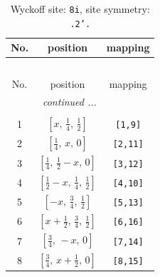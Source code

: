 \documentclass[fleqn,8pt]{jsarticle}
\begin{document}
\begin{longtable}{ccc}
\caption{Wyckoff site: {\tt 8i}, site symmetry: {\tt .2'.}}
 \\
 \hline \hline
No. & position & mapping \\ \hline \endfirsthead

\multicolumn{2}{l}{\tablename\ \thetable{}} \\
 \hline \hline
No. & position & mapping \\ \hline \endhead

 \hline \hline
\multicolumn{2}{r}{\footnotesize\it continued ...} \\ \endfoot

 \hline \hline
\multicolumn{2}{r}{} \\ \endlastfoot

1 & $\left[ x,\, \frac{1}{4},\, \frac{1}{2} \right]$ & {\tt [1,9]} \\ \hline
2 & $\left[ \frac{1}{4},\, x,\, 0 \right]$ & {\tt [2,11]} \\ \hline
3 & $\left[ \frac{1}{4},\, \frac{1}{2} - x,\, 0 \right]$ & {\tt [3,12]} \\ \hline
4 & $\left[ \frac{1}{2} - x,\, \frac{1}{4},\, \frac{1}{2} \right]$ & {\tt [4,10]} \\ \hline
5 & $\left[ - x,\, \frac{3}{4},\, \frac{1}{2} \right]$ & {\tt [5,13]} \\ \hline
6 & $\left[ x + \frac{1}{2},\, \frac{3}{4},\, \frac{1}{2} \right]$ & {\tt [6,16]} \\ \hline
7 & $\left[ \frac{3}{4},\, - x,\, 0 \right]$ & {\tt [7,14]} \\ \hline
8 & $\left[ \frac{3}{4},\, x + \frac{1}{2},\, 0 \right]$ & {\tt [8,15]} \\
\end{longtable}
\renewcommand{\arraystretch}{1.2}
\end{document}

